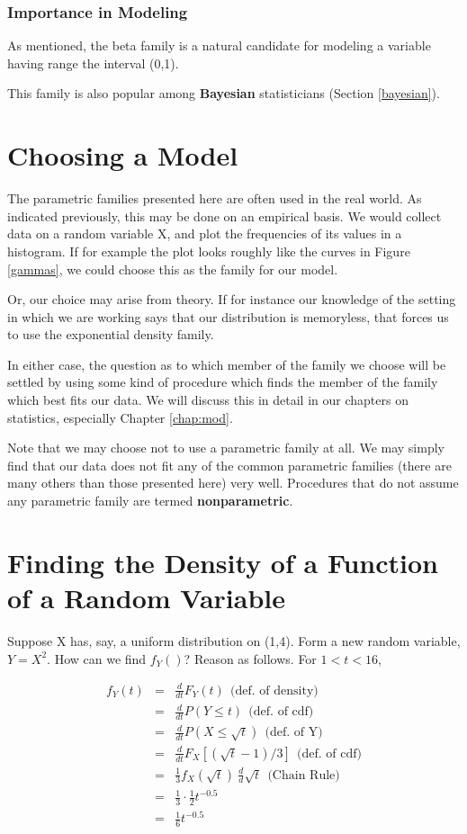 \subsubsection{Importance in Modeling}

As mentioned, the beta family is a natural candidate for modeling a
variable having range the interval (0,1).

This family is also popular among {\bf Bayesian} statisticians
(Section \ref{bayesian}).

\section{Choosing a Model}

The parametric families presented here are often used in the real world.
As indicated previously, this may be done on an empirical basis.  We
would collect data on a random variable X, and plot the frequencies of
its values in a histogram.  If for example the plot looks roughly like
the curves in Figure \ref{gammas}, we could choose this as the family
for our model.

Or, our choice may arise from theory.  If for instance our knowledge of
the setting in which we are working says that our distribution is
memoryless, that forces us to use the exponential density family.

In either case, the question as to which member of the family we choose
will be settled by using some kind of procedure which finds the
member of the family which best fits our data.  We will discuss this in
detail in our chapters on statistics, especially Chapter \ref{chap:mod}.

Note that we may choose not to use a parametric family at all.  We may
simply find that our data does not fit any of the common parametric
families (there are many others than those presented here) very well.
Procedures that do not assume any parametric family are termed {\bf
nonparametric}.

\section{Finding the Density of a Function of a Random Variable}
\label{densgofx}

Suppose X has, say, a uniform distribution on (1,4).  Form a new random
variable, $Y = X^2$.  How can we find $f_Y()$?  Reason as follows.  For
$1 < t < 16$,

\begin{eqnarray}
f_Y(t) &=& \frac{d}{dt} F_Y(t) ~~ \textrm{(def. of density)}\\ 
&=& \frac{d}{dt} P(Y \leq t) ~~ \textrm{(def. of cdf)} \\
&=& \frac{d}{dt} P(X \leq \sqrt{t}) ~~ \textrm{(def. of Y)} \\
&=& \frac{d}{dt} F_X[(\sqrt{t}-1)/3] ~~ \textrm{(def. of cdf)} \\
&=& \frac{1}{3} f_X(\sqrt{t}) ~ \frac{d}{d} \sqrt{t} ~~ \textrm{(Chain Rule)} \\
&=& \frac{1}{3} \cdot \frac{1}{2} t^{-0.5} \\
&=& \frac{1}{6} t^{-0.5}
\end{eqnarray}

